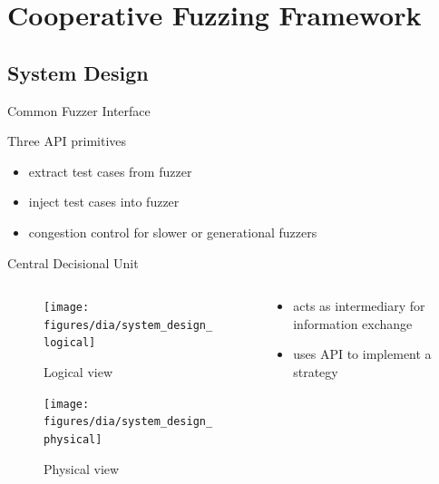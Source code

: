 \documentclass[\HandoutMode,table]{beamer}
\begin{document}
\section{Cooperative Fuzzing Framework}

\subsection{System Design}

\begin{frame}
    {Common Fuzzer Interface}
    \begin{block}{Three API primitives}
        \begin{itemize}[<+->]
            \item{} \alert{extract} test cases from fuzzer
            \item{} \alert{inject} test cases into fuzzer
            \item{} \alert{congestion control} for slower or generational
                fuzzers
        \end{itemize}
    \end{block}
\end{frame}

\begin{frame}
    {Central Decisional Unit}
    \begin{columns}
        \begin{column}{.5\textwidth}
            \begin{figure}
                \texttt{[image: figures/dia/system\_design\_logical]}
                \caption{Logical view}
            \end{figure}
            \begin{figure}
                \texttt{[image: figures/dia/system\_design\_physical]}
                \caption{Physical view}
            \end{figure}
        \end{column}
        \begin{column}{.5\textwidth}
            \begin{itemize}
                \item{} acts as intermediary for information exchange
                \item{} uses API to implement a strategy
            \end{itemize}
        \end{column}
    \end{columns}
\end{frame}
\end{document}
